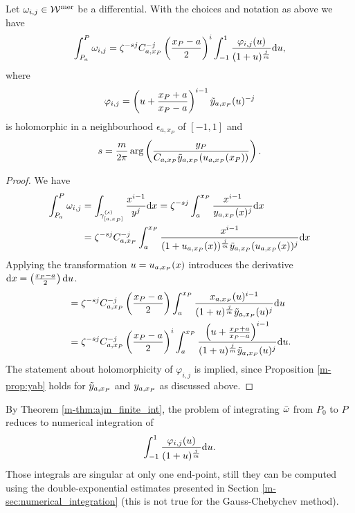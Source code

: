 \documentclass[main.tex]{subfiles}
\begin{document}
  \begin{thm}\label{thm:ajm_finite_int}
  Let $\omega_{i,j} \in \mathcal{W}^{\text{mer}}$ be a differential. With the choices and notation as above we have
 \begin{equation*}\label{eq:aj_int}
       \int_{P_a}^P \omega_{i,j} = \zeta^{-sj} C_{a,x_P}^{-j} \left(\frac{x_P-a}{2}\right)^i \int_{-1}^1 \frac{\varphi_{i,j}(u)}{(1+u)^{\frac{j}{m}}}  \mathrm d u,
  \end{equation*}
   where
   \begin{equation*}
    \varphi_{i,j}  = \left(u+\frac{x_P+a}{x_P-a}\right)^{i-1} \tilde{y}_{a,x_P}(u)^{-j}
   \end{equation*}
   is holomorphic in a neighbourhood $\epsilon_{a,x_P}$ of $[-1,1]$
   and
   \begin{equation*}
   s = \frac{m}{2\pi} \arg\left(  \frac{y_P}{C_{a,x_P} \tilde{y}_{a,x_P}( u_{a,x_P}(x_P) )} \right).
   \end{equation*}
  \end{thm}
  \begin{proof}
    We have
    \begin{align*}
     \int_{P_a}^P \omega_{i,j}  & =  \int_{\gamma^{(s)}_{[a,x_P]}} \frac{x^{i-1}}{y^j}  \mathrm d x  =  \zeta^{-sj} \int_a^{x_P} \frac{x^{i-1}}{y_{a,x_P}(x)^j}  \mathrm d x \\  & =
     \zeta^{-sj} C_{a,x_P}^{-j}  \int_a^{x_P} \frac{x^{i-1}}{(1+u_{a,x_P}(x))^{\frac{j}{m}}\tilde{y}_{a,x_P}(u_{a,x_P}(x))^j}  \mathrm d x
  \end{align*}
   Applying the transformation $u = u_{a,x_P}(x)$ introduces the derivative $\mathrm d x = \left(\frac{x_P-a}{2}\right) \mathrm d u$.
  \begin{align*}
   & =  \zeta^{-sj} C_{a,x_P}^{-j} \left(\frac{x_P-a}{2}\right) \int_a^{x_P} \frac{x_{a,x_P}(u)^{i-1}}{(1+u)^{\frac{j}{m}}\tilde{y}_{a,x_P}(u)^j}  \mathrm d u \\ & =
   \zeta^{-sj} C_{a,x_P}^{-j} \left(\frac{x_P-a}{2}\right)^i \int_a^{x_P} \frac{\left(u + \frac{x_P+a}{x_P-a}\right)^{i-1}}{(1+u)^{\frac{j}{m}}\tilde{y}_{a,x_P}(u)^j}  \mathrm d u.
  \end{align*}
  The statement about holomorphicity of $\varphi_{i,j}$ is implied, since
  Proposition \ref{m-prop:yab} holds for $\tilde{y}_{a,x_P}$ and $y_{a,x_P}$ as discussed
  above.
  \end{proof}

  \begin{rmk}\label{rmk:ajm_finite_int}
   By Theorem \ref{m-thm:ajm_finite_int}, the problem of integrating $\bar{\omega}$ from $P_0$ to $P$ reduces to numerical integration of
    \begin{equation*}
       \int_{-1}^1 \frac{\varphi_{i,j}(u)}{(1+u)^{\frac{j}{m}}}  \mathrm d u.
   \end{equation*}
   Those integrals are singular at only one end-point, still they
   can be computed using the double-exponential estimates presented in Section
   \ref{m-sec:numerical_integration} (this is not true for the Gauss-Chebychev method).
   \end{rmk}
\end{document}
